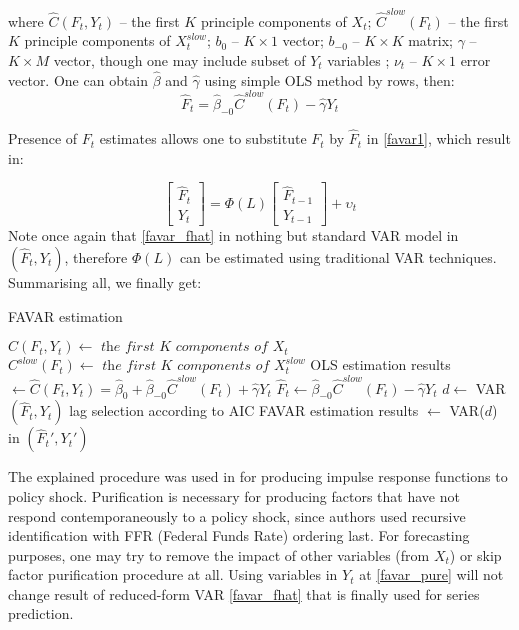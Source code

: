 \documentclass[a4paper, 14pt]{article}
\begin{document}
 \noindent where $\hat{C}(F_t, Y_t)$ -- the first $K$ principle components of $X_t$; $\hat{C}^{slow}(F_t)$ -- the first $K$ principle components of $X_t^{slow}$; $b_0$ -- $K \times 1$ vector; $b_{-0}$ -- $K \times K$ matrix; $\gamma$ -- $K \times M$ vector, though one may include subset of $Y_t$ variables  ; $\nu_t$ -- $K \times 1$ error vector. One can obtain $\hat{\beta}$ and $\hat{\gamma}$ using simple OLS method by rows, then: 
 \[\hat{F}_t = \hat{\beta}_{-0} \hat{C}^{slow}(F_t) - \hat{\gamma}Y_t      \]  
 
 \noindent Presence of $F_t$ estimates allows one to substitute $F_t$ by $\hat{F}_t$ in \eqref{favar1},  which result in:
 
 \begin{equation}\label{favar_fhat}
 	\begin{bmatrix}
 	\hat{F}_t \\
 	Y_t
 	\end{bmatrix} = \Phi (L) 
 	\begin{bmatrix}
 	\hat{F}_{t-1} \\
 	Y_{t-1}
 	\end{bmatrix} + \upsilon_t
 \end{equation}
 Note once again that \eqref{favar_fhat} in nothing but standard VAR model in $(\hat{F}_t, Y_t)$, therefore $\Phi(L)$ can be estimated using traditional VAR techniques. Summarising all, we finally get:

\begin{algorithm}
	\caption{FAVAR estimation}
	$C(F_t,Y_t) \gets \textit{ the first K components of } X_t $ \newline
	$C^{slow}(F_t) \gets \textit{ the first K components of } X_t^{slow}$ \newline
	OLS estimation results $\gets \hat{C}(F_t, Y_t) = \hat{\beta}_0 + \hat{\beta}_{-0} \hat{C}^{slow}(F_t) + \hat{\gamma} Y_t$\newline
	$\hat{F}_t \gets \hat{\beta}_{-0} \hat{C}^{slow}(F_t) - \hat{\gamma}Y_t$\newline
	$d \gets$ VAR$(\hat{F}_t, Y_t)$ lag selection according to AIC\newline
	FAVAR estimation results $\gets$ VAR($d$) in $(\hat{F}_t', Y_t')$
\end{algorithm}

The explained procedure was used in \cite{bernanke2005measuring} for producing impulse response functions to policy shock. Purification is necessary for producing factors that have not respond contemporaneously to a policy shock, since authors used recursive identification with FFR (Federal Funds Rate) ordering last. For forecasting purposes, one may try to remove the impact of other variables (from $X_t$) or skip factor purification procedure at all. Using variables in $Y_t$ at \eqref{favar_pure} will not change result of reduced-form VAR \eqref{favar_fhat} that is finally used for series prediction.
\end{document}
